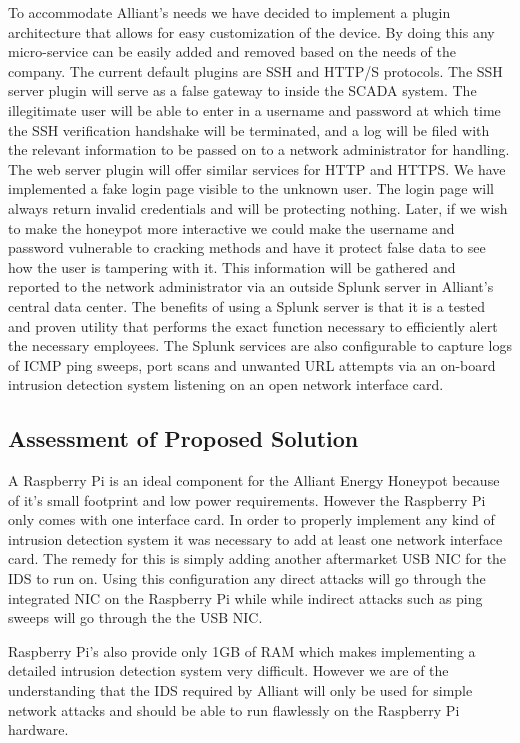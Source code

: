 To accommodate Alliant’s needs we have decided to implement a plugin architecture that allows for easy customization of the device. By doing this any micro-service can be easily added and removed based on the needs of the company. The current default plugins are SSH and HTTP/S protocols. The SSH server plugin will serve as a false gateway to inside the SCADA 
system.  The illegitimate user will be able to enter in a username and password at which time the SSH verification handshake will be terminated,
and a log will be filed with the relevant information to be passed on to a network administrator for handling.  The web server plugin will
offer similar services for HTTP and HTTPS.  We have implemented a fake login page visible to the unknown user.  The
login page will always return invalid credentials and will be protecting nothing.  Later, if we wish to make the honeypot more
interactive we could make the username and password vulnerable to cracking methods and have it protect false data to see how the
user is tampering with it.  This information will be gathered and reported to the network administrator via an outside Splunk
server in Alliant’s central data center.  The benefits of using a Splunk server is that it is a tested and proven utility that performs
the exact function necessary to efficiently alert the necessary employees.  The Splunk services are also configurable to capture
logs of ICMP ping sweeps, port scans and unwanted URL attempts via an on-board intrusion detection system listening on an open network interface card.   

\subsection{Assessment of Proposed Solution}

A Raspberry Pi is an ideal component for the Alliant Energy Honeypot because of it's small footprint and low power requirements. However the Raspberry Pi only comes with one interface card. In order to properly implement any kind of intrusion detection system it was necessary to add at least one network interface card. The remedy for this is simply adding another aftermarket USB NIC for the IDS to run on. Using this configuration any direct attacks will go through the integrated NIC on the Raspberry Pi while while indirect attacks such as ping sweeps will go through the the USB NIC.

Raspberry Pi’s also provide only 1GB of RAM which makes implementing a detailed intrusion detection system very difficult.  However we are of the understanding that the IDS required by Alliant will only be used for simple network attacks and should be able to run flawlessly on the Raspberry Pi hardware.

